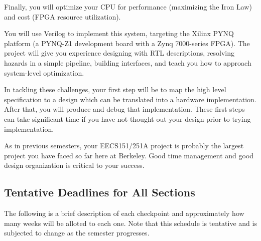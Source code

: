 \documentclass[11pt]{article}
\begin{document}
Finally, you will optimize your CPU for performance (maximizing the Iron Law) and cost (FPGA resource utilization).

You will use Verilog to implement this system, targeting the Xilinx PYNQ platform (a PYNQ-Z1 development board with a Zynq 7000-series FPGA).
The project will give you experience designing with RTL descriptions, resolving hazards in a simple pipeline, building interfaces, and teach you how to approach system-level optimization.

In tackling these challenges, your first step will be to map the high level specification to a design which can be translated into a hardware implementation.
After that, you will produce and debug that implementation.
These first steps can take significant time if you have not thought out your design prior to trying implementation.

As in previous semesters, your EECS151/251A project is probably the largest project you have faced so far here at Berkeley.
Good time management and good design organization is critical to your success.

\subsection{Tentative Deadlines for All Sections}
\label{tentative_deadlines}
The following is a brief description of each checkpoint and approximately how many weeks will be alloted to each one. Note that this schedule is tentative and is subjected to change as the semester progresses.

\end{document}
